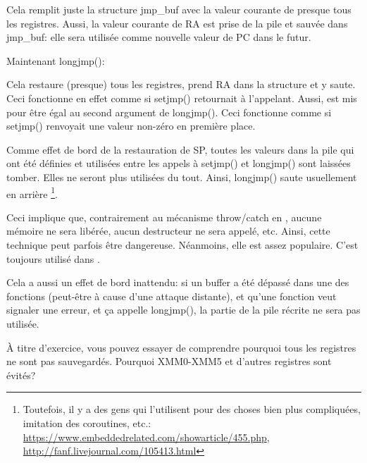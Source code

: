 

Cela remplit juste la structure jmp\_buf avec la valeur courante de presque tous les registres.
Aussi, la valeur courante de \ac{RA} est prise de la pile et sauvée dans jmp\_buf:
elle sera utilisée comme nouvelle valeur de \ac{PC} dans le futur.

Maintenant longjmp():



Cela restaure (presque) tous les registres, prend \ac{RA} dans la structure et y saute.
Ceci fonctionne en effet comme si setjmp() retournait à l'appelant.
Aussi,  est mis pour être égal au second argument de longjmp().
Ceci fonctionne comme si setjmp() renvoyait une valeur non-zéro en première place. %

Comme effet de bord de la restauration de \ac{SP}, toutes les valeurs dans la pile qui
ont été définies et utilisées entre les appels à setjmp() et longjmp() sont laissées
tomber.
Elles ne seront plus utilisées du tout.
Ainsi, longjmp() saute usuellement en arrière
\footnote{Toutefois, il y a des gens qui l'utilisent pour des choses bien plus compliquées,
imitation des coroutines, etc.: \url{https://www.embeddedrelated.com/showarticle/455.php},
\url{http://fanf.livejournal.com/105413.html}}.

Ceci implique que, contrairement au mécanisme throw/catch en \Cpp, aucune mémoire
ne sera libérée, aucun destructeur ne sera appelé, etc.
Ainsi, cette technique peut parfois être dangereuse.
Néanmoins, elle est assez populaire. C'est toujours utilisé dans \oracle.

Cela a aussi un effet de bord inattendu: si un buffer a été dépassé dans une des
fonctions (peut-être à cause d'une attaque distante), et qu'une fonction veut signaler
une erreur, et ça appelle longjmp(), la partie de la pile récrite ne sera pas utilisée.

À titre d'exercice, vous pouvez essayer de comprendre pourquoi tous les registres
ne sont pas sauvegardés.
Pourquoi XMM0-XMM5 et d'autres registres sont évités?
